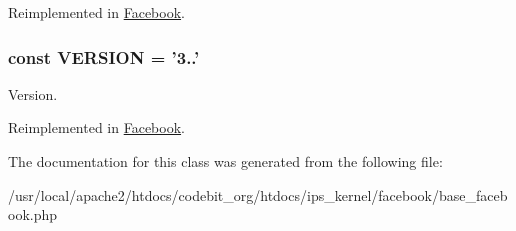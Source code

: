 Reimplemented in \hyperlink{class_facebook_a598ca4e71b15a1313ec95f0df1027ca5}{Facebook}.

\hypertarget{class_base_facebook_af71005841ce53adac00581ab0ba24c1f}{
\subsubsection[{V\-E\-R\-S\-I\-O\-N}]{\setlength{\rightskip}{0pt plus 5cm}const V\-E\-R\-S\-I\-O\-N = '3..'}}\label{class_base_facebook_af71005841ce53adac00581ab0ba24c1f}
Version. 

Reimplemented in \hyperlink{class_facebook_af71005841ce53adac00581ab0ba24c1f}{Facebook}.



The documentation for this class was generated from the following file\-:\begin{DoxyCompactItemize}
\item 
/usr/local/apache2/htdocs/codebit\-\_\-org/htdocs/ips\-\_\-kernel/facebook/base\-\_\-facebook.\-php\end{DoxyCompactItemize}
